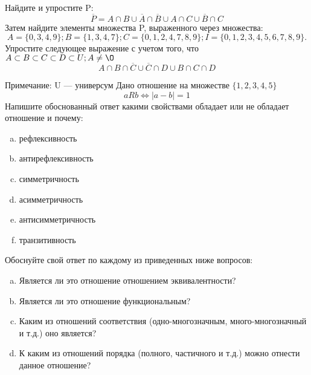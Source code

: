 \documentclass[10pt]{exam}
\begin{document}
\begin{questions}
\question
Найдите и упростите P:
\begin{equation*}
\overline{P} = A \cap B \cup \overline{A} \cap \overline{B} \cup A \cap C \cup \overline{B} \cap C
\end{equation*}
Затем найдите элементы множества P, выраженного через множества:
\begin{equation*}
A = \{0, 3, 4, 9\}; 
B = \{1, 3, 4, 7\};
C = \{0, 1, 2, 4, 7, 8, 9\};
I = \{0, 1, 2, 3, 4, 5, 6, 7, 8, 9\}.
\end{equation*}\question
Упростите следующее выражение с учетом того, что $A\subset B \subset C \subset D \subset U; A \neq \O$
\begin{equation*}
A \cap B  \cap \overline{C} \cup \overline{C} \cap D \cup B \cap C \cap D
\end{equation*}

Примечание: U — универсум\question
Дано отношение на множестве $\{1, 2, 3, 4, 5\}$ 
\begin{equation*}
aRb \iff |a-b| = 1
\end{equation*}
Напишите обоснованный ответ какими свойствами обладает или не обладает отношение и почему:   
\begin{enumerate} [a)]\setcounter{enumi}{0}
\item рефлексивность
\item антирефлексивность
\item симметричность
\item асимметричность
\item антисимметричность
\item транзитивность
\end{enumerate}

Обоснуйте свой ответ по каждому из приведенных ниже вопросов:
\begin{enumerate} [a)]\setcounter{enumi}{0}
    \item Является ли это отношение отношением эквивалентности?
    \item Является ли это отношение функциональным?
    \item Каким из отношений соответствия (одно-многозначным, много-многозначный и т.д.) оно является?
    \item К каким из отношений порядка (полного, частичного и т.д.) можно отнести данное отношение?
\end{enumerate}


\end{questions}
\end{document}
